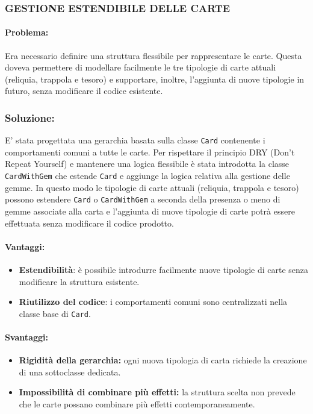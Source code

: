 \documentclass[a4paper,12pt]{report}
\begin{document}
\subsubsection{GESTIONE ESTENDIBILE DELLE CARTE}

\paragraph{Problema:}
Era necessario definire una struttura flessibile per rappresentare le carte.
Questa doveva permettere di modellare facilmente le tre tipologie di carte attuali (reliquia, trappola e tesoro)
e supportare, inoltre, l'aggiunta di nuove tipologie in futuro, senza modificare il codice esistente.

\subsubsection{Soluzione:}
E' stata progettata una gerarchia basata sulla classe \texttt{Card} contenente i comportamenti comuni a tutte le carte.
Per rispettare il principio DRY (Don't Repeat Yourself) e mantenere una logica flessibile 
è stata introdotta la classe \texttt{CardWithGem} che estende \texttt{Card} e aggiunge la logica relativa alla gestione
delle gemme.
In questo modo le tipologie di carte attuali (reliquia, trappola e tesoro) possono estendere \texttt{Card} o \texttt{CardWithGem}
a seconda della presenza o meno di gemme associate alla carta e l'aggiunta di nuove tipologie di carte potrà essere effettuata
senza modificare il codice prodotto.

\paragraph{Vantaggi:}
\begin{itemize}
	\item \textbf{Estendibilità}: è possibile introdurre facilmente nuove tipologie di carte
	senza modificare la struttura esistente.
	\item \textbf{Riutilizzo del codice}: i comportamenti comuni sono centralizzati nella classe base di \texttt{Card}.
\end{itemize}

\paragraph{Svantaggi:}
\begin{itemize}
	\item \textbf{Rigidità della gerarchia:} ogni nuova tipologia di carta richiede 
	la creazione di una sottoclasse dedicata.
	\item \textbf{Impossibilità di combinare più effetti:} la struttura scelta non prevede 
	che le carte possano combinare più effetti contemporaneamente.
\end{itemize}
\end{document}
